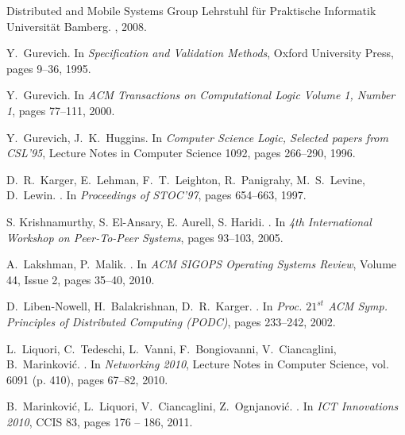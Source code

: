 \documentclass{amsart}
\theoremstyle{definition}
\begin{document}
\begin{thebibliography}{}
\newblock Distributed and Mobile Systems Group Lehrstuhl f\"ur Praktische Informatik Universit\"at Bamberg.
, 2008.

 Y.~Gurevich.
\newblock In {\em Specification and Validation Methods}, Oxford University Press, pages 9--36, 1995.

 Y.~Gurevich.
\newblock In {\em ACM Transactions on Computational Logic Volume 1, Number 1}, pages 77--111, 2000.

 Y.~Gurevich, J.~K.~Huggins.
\newblock In {\em Computer Science Logic, Selected papers from CSL'95}, Lecture Notes in Computer Science 1092, pages 266--290, 1996.

 D.~R.~Karger, E.~Lehman, F.~T.~Leighton, R.~Panigrahy, M.~S.~Levine, D.~Lewin.
.
\newblock In {\em Proceedings of STOC'97}, pages 654--663, 1997.

S. Krishnamurthy, S. El-Ansary, E. Aurell, S. Haridi.
.
\newblock In {\em 4th International Workshop on Peer-To-Peer Systems}, pages 93--103, 2005.

A.~Lakshman, P.~Malik.
.
\newblock In {\em ACM SIGOPS Operating Systems Review}, Volume 44, Issue 2, pages 35--40, 2010.

D.~Liben-Nowell, H.~Balakrishnan, D.~R.~Karger.
.
\newblock In {\em Proc. $21^{st}$ ACM Symp. Principles of Distributed Computing (PODC)}, pages 233--242, 2002.



L.~Liquori, C.~Tedeschi, L.~Vanni, F.~Bongiovanni, V.~Ciancaglini, B.~Marinkovi\'{c}.
.
\newblock In {\em Networking 2010}, Lecture Notes in Computer Science, vol. 6091 (p. 410), pages 67--82, 2010.

B.~Marinkovi\'c, L.~Liquori, V.~Ciancaglini, Z.~Ognjanovi\'c.
.
\newblock In {\em ICT Innovations 2010}, CCIS 83, pages 176 -- 186, 2011.


\end{thebibliography}
\end{document}
